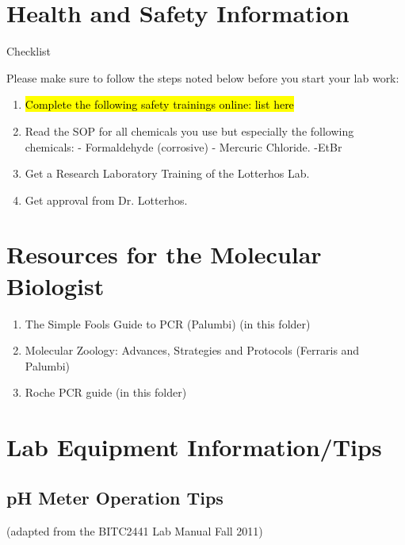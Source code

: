 \documentclass[11pt, oneside]{article}
\begin{document}
\section{Health and Safety Information}

	Checklist 

	Please make sure to follow the steps noted below before you start your lab work: 

	\begin{enumerate}
		\item \hl{Complete the following safety trainings online: 
		list here}
		\item Read the SOP for all chemicals you use but especially the following chemicals:
		- Formaldehyde (corrosive)
		- Mercuric Chloride. 
		-EtBr
		
		\item Get a Research Laboratory Training of the Lotterhos Lab.
		\item Get approval from Dr. Lotterhos.

	\end{enumerate}

	\newpage

\section{Resources for the Molecular Biologist}

	\begin{enumerate}

		\item The Simple Fool\textquotesingle s Guide to PCR (Palumbi) (in this folder)
		\item Molecular Zoology: Advances, Strategies and Protocols (Ferraris and Palumbi)
		\item Roche PCR guide (in this folder)

	\end{enumerate}

\newpage




\section{Lab Equipment Information/Tips}

	\subsection{pH Meter Operation Tips}

		(adapted from the BITC2441 Lab Manual Fall 2011)
	
\end{document}
